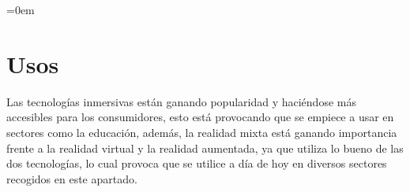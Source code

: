 \parindent=0em
\section{Usos}
\noindent

Las tecnologías inmersivas están ganando popularidad y haciéndose más accesibles para los consumidores, esto está provocando que se empiece a usar en sectores como la educación, además, la realidad mixta está ganando importancia frente a la realidad virtual y la realidad aumentada, ya que utiliza lo bueno de las dos tecnologías, lo cual provoca que se utilice a día de hoy en diversos sectores recogidos en este apartado.







